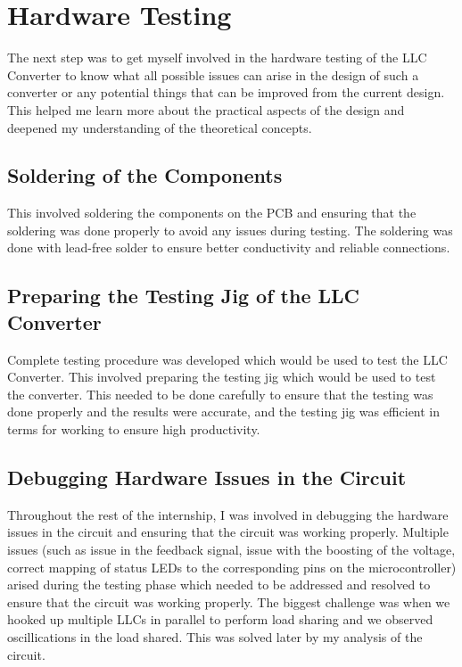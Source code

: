 \section{Hardware Testing}
The next step was to get myself involved in the hardware testing of the LLC Converter to know what
all possible issues can arise in the design of such a converter or any potential things that can be
improved from the current design.\\
This helped me learn more about the practical aspects of the design and deepened my understanding of the theoretical concepts.

\subsection{Soldering of the Components}
This involved soldering the components on the PCB and ensuring that the soldering was done properly to avoid any issues during testing.
The soldering was done with lead-free solder to ensure better conductivity and reliable connections.
\subsection{Preparing the Testing Jig of the LLC Converter}
Complete testing procedure was developed which would be used to test the LLC Converter. This involved preparing the testing jig which would be used to test the converter.
This needed to be done carefully to ensure that the testing was done properly and the results were accurate, and the testing jig was efficient in terms for working to ensure high productivity.

\subsection{Debugging Hardware Issues in the Circuit}
Throughout the rest of the internship, I was involved in debugging the hardware issues in the circuit and ensuring that the circuit was working properly.
Multiple issues (such as issue in the feedback signal, issue with the boosting of the voltage, correct mapping of status LEDs to the corresponding pins on the microcontroller) arised during the testing phase which needed to be addressed and resolved to ensure that the circuit was working properly.
The biggest challenge was when we hooked up multiple LLCs in parallel to perform load sharing and we observed oscillications in the load shared. This was solved later by my analysis of the circuit.

